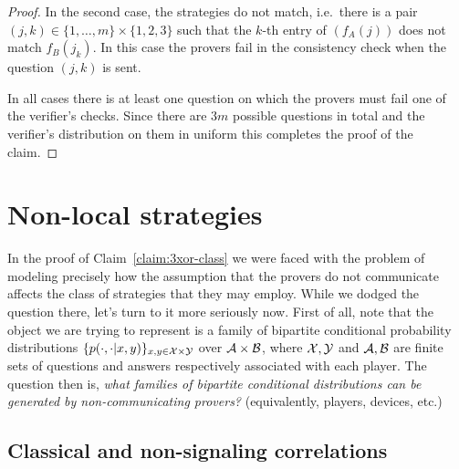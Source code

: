 \begin{proof}
In the second case, the strategies do not match, i.e.\ there is a pair $(j,k)\in \{1,\ldots,m\}\times\{1,2,3\}$ such that the $k$-th entry of $(f_A(j))$ does not match $f_B(j_k)$. In this case the provers fail in the consistency check when the question $(j,k)$ is sent. 

In all cases there is at least one question on which the provers must fail one of the verifier's checks. Since there are $3m$ possible questions  in total and the verifier's distribution on them in uniform this completes the proof of the claim. 
\end{proof}

\section{Non-local strategies}

In the proof of Claim~\ref{claim:3xor-class} we were faced with the problem of modeling precisely how the assumption that the provers do not communicate affects the class of strategies that they may employ. While we dodged the question there, let's turn to it more seriously now. First of all, note that the object we are trying to represent is a family of bipartite conditional probability distributions $\{p(\cdot,\cdot|x,y)\}_{x,y\in \mathcal{X}\times\mathcal{Y}}$ over $\mathcal{A}\times \mathcal{B}$, where $\mathcal{X},\mathcal{Y}$ and $\mathcal{A},\mathcal{B}$ are finite sets of questions and answers respectively associated with each player. The question then is, \emph{what families of bipartite conditional distributions can be generated by non-communicating provers?} (equivalently, players, devices, etc.) 

\subsection{Classical and non-signaling correlations}

